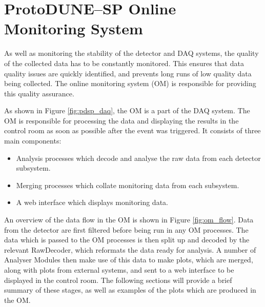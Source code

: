 \section{ProtoDUNE--SP Online Monitoring System} \label{sec:pdsp_om}

As well as monitoring the stability of the detector and DAQ systems, the quality
of the collected data has to be constantly monitored. This ensures that data
quality issues are quickly identified, and prevents long runs of low quality
data being collected. The online monitoring system (OM) is responsible for 
providing this quality assurance.

As shown in Figure \ref{fig:pdsp_daq}, the OM is a part of the \protodune{} DAQ
system. The OM is responsible for processing the data and displaying
the results in the control room as soon as possible after the event was 
triggered. It consists of three main components:
\begin{itemize}
	\item Analysis processes which decode and analyse the raw data from each 
		detector subsystem.
	\item Merging processes which collate monitoring data from each subsystem.
	\item A web interface which displays monitoring data.
\end{itemize}

\noindent
An overview of the data flow in the OM is shown in Figure \ref{fig:om_flow}. 
Data from the detector are first filtered before being run in any OM processes. 
The data which is passed to the OM processes is then split up and decoded by 
the relevant RawDecoder, which reformats the data ready for analysis. A 
number of Analyser Modules then make use of this data to make plots, 
which are merged, along with plots from external systems, and sent to a web 
interface to be displayed in the control room. The following sections will 
provide a brief summary of these stages, as well as examples of the plots 
which are produced in the OM.

